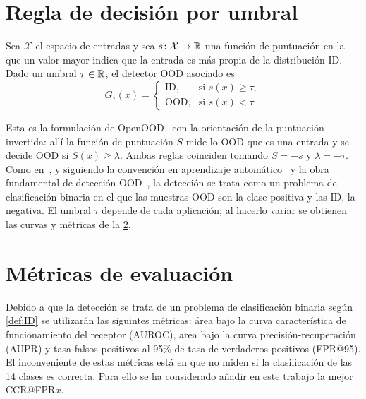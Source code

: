 \section{Regla de decisión por umbral}\label{sec:regla-umbral}

\begin{definicion}\label{def:detector}
Sea $\mathcal{X}$ el espacio de entradas y sea $s\colon \mathcal{X} \to \mathbb{R}$ una función de puntuación en la que un valor mayor indica que la entrada es más propia de la distribución ID. Dado un umbral $\tau \in \mathbb{R}$, el detector OOD asociado es
\[
  G_\tau(x) =
  \begin{cases}
    \text{ID}, & \text{si } s(x) \geq \tau,\\
    \text{OOD}, & \text{si } s(x) < \tau.
  \end{cases}
\]
\end{definicion}

Esta es la formulación de OpenOOD~\cite[ec.~(1)]{openood15} con la orientación de la puntuación invertida: allí la función de puntuación $S$ mide lo OOD que es una entrada y se decide OOD si $S(x) \geq \lambda$. Ambas reglas coinciden tomando $S = -s$ y $\lambda = -\tau$. Como en~\cite{openood15}, y siguiendo la convención en aprendizaje automático~\cite{provost1998case} y la obra fundamental de detección OOD~\cite{hendrycks2017}, la detección se trata como un problema de clasificación binaria en el que las muestras OOD son la clase positiva y las ID, la negativa. El umbral $\tau$ depende de cada aplicación; al hacerlo variar se obtienen las curvas y métricas de la \cref{sec:metricas}.

\section{Métricas de evaluación}\label{sec:metricas}
Debido a que la detección se trata de un problema de clasificación binaria según \cref{def:ID} se utilizarán las siguintes métricas: área bajo la curva característica de funcionamiento del receptor (AUROC), area bajo la curva precisión-recuperación (AUPR) y tasa falsos positivos al 95\% de tasa de verdaderos positivos (FPR@95).
El inconveniente de estas métricas está en que no miden si la clasificación de las 14 clases es correcta. Para ello se ha considerado añadir en este trabajo la mejor CCR@FPR$x$.

